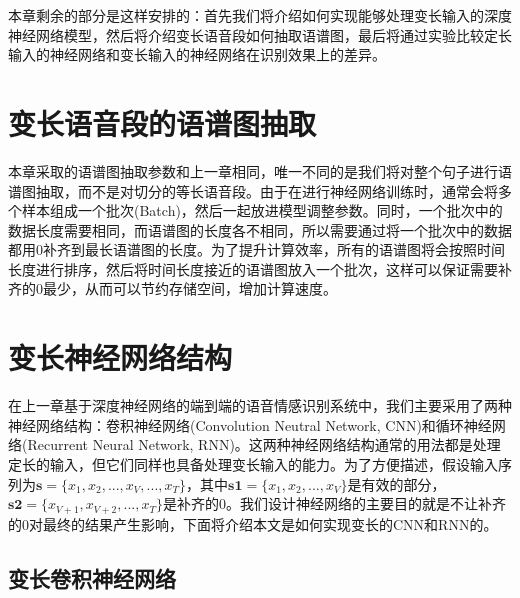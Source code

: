 本章剩余的部分是这样安排的：首先我们将介绍如何实现能够处理变长输入的深度神经网络模型，然后将介绍变长语音段如何抽取语谱图，最后将通过实验比较定长输入的神经网络和变长输入的神经网络在识别效果上的差异。

\section{变长语音段的语谱图抽取}

本章采取的语谱图抽取参数和上一章相同，唯一不同的是我们将对整个句子进行语谱图抽取，而不是对切分的等长语音段。由于在进行神经网络训练时，通常会将多个样本组成一个批次(Batch)，然后一起放进模型调整参数。同时，一个批次中的数据长度需要相同，而语谱图的长度各不相同，所以需要通过将一个批次中的数据都用0补齐到最长语谱图的长度。为了提升计算效率，所有的语谱图将会按照时间长度进行排序，然后将时间长度接近的语谱图放入一个批次，这样可以保证需要补齐的0最少，从而可以节约存储空间，增加计算速度。

\section{变长神经网络结构}
\label{sec:var_len_nn}

在上一章基于深度神经网络的端到端的语音情感识别系统中，我们主要采用了两种神经网络结构：卷积神经网络(Convolution Neutral Network, CNN)和循环神经网络(Recurrent Neural Network, RNN)。这两种神经网络结构通常的用法都是处理定长的输入，但它们同样也具备处理变长输入的能力。为了方便描述，假设输入序列为$\mathbf{s} = \{x_1, x_2,...,x_V,...,x_T\}$，其中$\mathbf{s1} = \{x_1, x_2,...,x_V\}$是有效的部分，$\mathbf{s2} = \{x_{V+1}, x_{V+2},...,x_T\}$是补齐的0。我们设计神经网络的主要目的就是不让补齐的0对最终的结果产生影响，下面将介绍本文是如何实现变长的CNN和RNN的。

\subsection{变长卷积神经网络}
\label{ssec:var_len_cnn}

